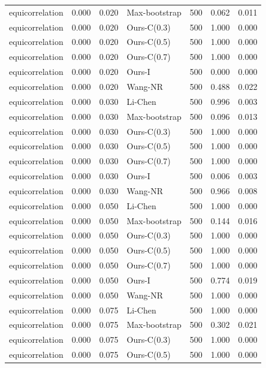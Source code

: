 \begin{tabular}{lrrlrrr}
equicorrelation & 0.000 & 0.020 & Max-bootstrap & 500 & 0.062 & 0.011 \\
equicorrelation & 0.000 & 0.020 & Ours-C(0.3) & 500 & 1.000 & 0.000 \\
equicorrelation & 0.000 & 0.020 & Ours-C(0.5) & 500 & 1.000 & 0.000 \\
equicorrelation & 0.000 & 0.020 & Ours-C(0.7) & 500 & 1.000 & 0.000 \\
equicorrelation & 0.000 & 0.020 & Ours-I & 500 & 0.000 & 0.000 \\
equicorrelation & 0.000 & 0.020 & Wang-NR & 500 & 0.488 & 0.022 \\
equicorrelation & 0.000 & 0.030 & Li-Chen & 500 & 0.996 & 0.003 \\
equicorrelation & 0.000 & 0.030 & Max-bootstrap & 500 & 0.096 & 0.013 \\
equicorrelation & 0.000 & 0.030 & Ours-C(0.3) & 500 & 1.000 & 0.000 \\
equicorrelation & 0.000 & 0.030 & Ours-C(0.5) & 500 & 1.000 & 0.000 \\
equicorrelation & 0.000 & 0.030 & Ours-C(0.7) & 500 & 1.000 & 0.000 \\
equicorrelation & 0.000 & 0.030 & Ours-I & 500 & 0.006 & 0.003 \\
equicorrelation & 0.000 & 0.030 & Wang-NR & 500 & 0.966 & 0.008 \\
equicorrelation & 0.000 & 0.050 & Li-Chen & 500 & 1.000 & 0.000 \\
equicorrelation & 0.000 & 0.050 & Max-bootstrap & 500 & 0.144 & 0.016 \\
equicorrelation & 0.000 & 0.050 & Ours-C(0.3) & 500 & 1.000 & 0.000 \\
equicorrelation & 0.000 & 0.050 & Ours-C(0.5) & 500 & 1.000 & 0.000 \\
equicorrelation & 0.000 & 0.050 & Ours-C(0.7) & 500 & 1.000 & 0.000 \\
equicorrelation & 0.000 & 0.050 & Ours-I & 500 & 0.774 & 0.019 \\
equicorrelation & 0.000 & 0.050 & Wang-NR & 500 & 1.000 & 0.000 \\
equicorrelation & 0.000 & 0.075 & Li-Chen & 500 & 1.000 & 0.000 \\
equicorrelation & 0.000 & 0.075 & Max-bootstrap & 500 & 0.302 & 0.021 \\
equicorrelation & 0.000 & 0.075 & Ours-C(0.3) & 500 & 1.000 & 0.000 \\
equicorrelation & 0.000 & 0.075 & Ours-C(0.5) & 500 & 1.000 & 0.000 \\

\end{tabular}
